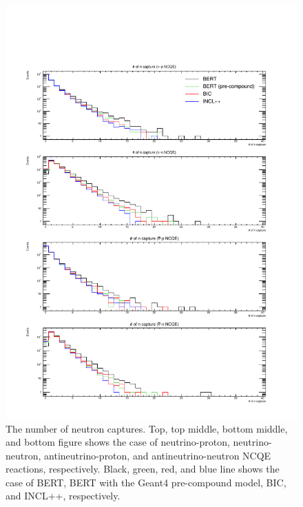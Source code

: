 \begin{figure}[h]
	\centering
	\includegraphics[width=16cm]{PDF/Secondary/Comparison_PreCompound/neutron/pdf1/Logy_NumCap}
	\caption[The number of neutron captures]{
	The number of neutron captures.
	Top, top middle, bottom middle, and bottom figure shows the case of neutrino-proton, neutrino-neutron, antineutrino-proton, and antineutrino-neutron NCQE reactions, respectively.
	Black, green, red, and blue line shows the case of BERT, BERT with the Geant4 pre-compound model, BIC, and INCL++, respectively.
	}\label{Others_neutron_Logy_NumCap}
\end{figure}

